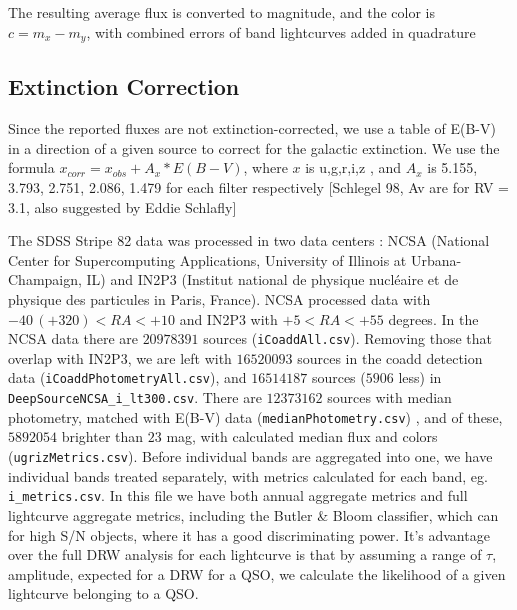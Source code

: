 \documentclass[fleqn,usenatbib]{mnras}  %
\begin{document}
The resulting average flux is converted to magnitude, and the color is  $c = m_{x}-m_{y}$, with combined errors of band lightcurves added in quadrature

\subsection{Extinction Correction}

Since the reported fluxes are not extinction-corrected, we use a table of E(B-V) in a direction of a given source to correct for the galactic extinction. We use the formula  $x_{corr}  = x_{obs} + A_{x} * E(B-V)$, where $x$ is  u,g,r,i,z , and $A_x$ is 5.155, 3.793, 2.751, 2.086, 1.479  for each filter respectively  [Schlegel 98, Av are for RV = 3.1, also suggested by Eddie Schlafly] 


The SDSS Stripe 82 data was processed in two data centers : NCSA (National Center for Supercomputing Applications, University of Illinois at Urbana-Champaign, IL) and IN2P3  (Institut national de physique nucl\'eaire et de physique des particules in Paris, France). NCSA processed data  with  $-40 \, (+320) < RA < +10 $ and IN2P3 with $ +5 < RA < +55$ degrees. In the NCSA data  there are $20978391$ sources (\verb|iCoaddAll.csv|). Removing those that overlap with IN2P3, we are left with  $16520093$ sources in the coadd detection data (\verb|iCoaddPhotometryAll.csv|), and $16514187$ sources ($5906$ less) in \verb|DeepSourceNCSA_i_lt300.csv|. There are $12373162$ sources with median photometry, matched with E(B-V) data (\verb|medianPhotometry.csv|) , and  of these, $5892054$ brighter than $23$ mag, with calculated median flux and colors (\verb|ugrizMetrics.csv|). Before individual bands are aggregated into one, we have individual bands treated separately, with metrics calculated for each band, eg. \verb|i_metrics.csv|. In this file we have both annual aggregate metrics and full lightcurve aggregate metrics, including the Butler \& Bloom classifier, which can  for high S/N objects, where it has a good discriminating power. It's advantage over the full DRW analysis for each lightcurve is that by assuming a range of $\tau$, amplitude, expected for a DRW for a QSO, we calculate the likelihood of a given lightcurve belonging to a QSO. 
\end{document}
